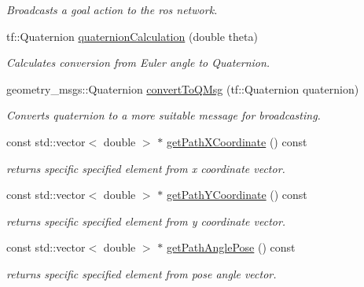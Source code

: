 \begin{DoxyCompactItemize}
\begin{DoxyCompactList}\small\item\em Broadcasts a goal action to the ros network. \end{DoxyCompactList}\item 
tf\-::\-Quaternion \hyperlink{classLawnMower_a97a31ca30db64496d5a85b4218f69cab}{quaternion\-Calculation} (double theta)
\begin{DoxyCompactList}\small\item\em Calculates conversion from Euler angle to Quaternion. \end{DoxyCompactList}\item 
geometry\-\_\-msgs\-::\-Quaternion \hyperlink{classLawnMower_a568bac793e0082f6ff89ac918a671c3b}{convert\-To\-Q\-Msg} (tf\-::\-Quaternion quaternion)
\begin{DoxyCompactList}\small\item\em Converts quaternion to a more suitable message for broadcasting. \end{DoxyCompactList}\item 
const std\-::vector$<$ double $>$ $\ast$ \hyperlink{classLawnMower_a989d400596032888d1e063dc289768b2}{get\-Path\-X\-Coordinate} () const 
\begin{DoxyCompactList}\small\item\em returns specific specified element from x coordinate vector. \end{DoxyCompactList}\item 
const std\-::vector$<$ double $>$ $\ast$ \hyperlink{classLawnMower_a3def1589d73101f642f7465ec740762d}{get\-Path\-Y\-Coordinate} () const 
\begin{DoxyCompactList}\small\item\em returns specific specified element from y coordinate vector. \end{DoxyCompactList}\item 
const std\-::vector$<$ double $>$ $\ast$ \hyperlink{classLawnMower_aec7ea498bca8e6092d7d8ae1f90417c3}{get\-Path\-Angle\-Pose} () const 
\begin{DoxyCompactList}\small\item\em returns specific specified element from pose angle vector. \end{DoxyCompactList}\end{DoxyCompactItemize}


